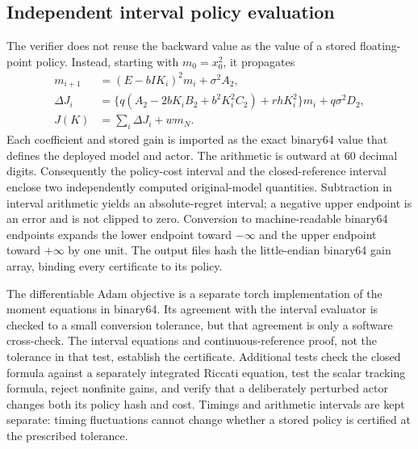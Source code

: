 \subsection{Independent interval policy evaluation}
The verifier does not reuse the backward value as the value of a stored floating-point policy. Instead, starting with $m_0=x_0^2$, it propagates
\begin{align*}
 m_{i+1}&=(E-bIK_i)^2m_i+\sigma^2A_2,\\
 \Delta J_i&=\{q(A_2-2bK_iB_2+b^2K_i^2C_2)+rhK_i^2\}m_i+q\sigma^2D_2,\\
 J(K)&=\sum_i\Delta J_i+w m_N.
\end{align*}
Each coefficient and stored gain is imported as the exact binary64 value that defines the deployed model and actor. The arithmetic is outward at 60 decimal digits. Consequently the policy-cost interval and the closed-reference interval enclose two independently computed original-model quantities. Subtraction in interval arithmetic yields an absolute-regret interval; a negative upper endpoint is an error and is not clipped to zero. Conversion to machine-readable binary64 endpoints expands the lower endpoint toward $-\infty$ and the upper endpoint toward $+\infty$ by one unit. The output files hash the little-endian binary64 gain array, binding every certificate to its policy.

The differentiable Adam objective is a separate torch implementation of the moment equations in binary64. Its agreement with the interval evaluator is checked to a small conversion tolerance, but that agreement is only a software cross-check. The interval equations and continuous-reference proof, not the tolerance in that test, establish the certificate. Additional tests check the closed formula against a separately integrated Riccati equation, test the scalar tracking formula, reject nonfinite gains, and verify that a deliberately perturbed actor changes both its policy hash and cost. Timings and arithmetic intervals are kept separate: timing fluctuations cannot change whether a stored policy is certified at the prescribed tolerance.
